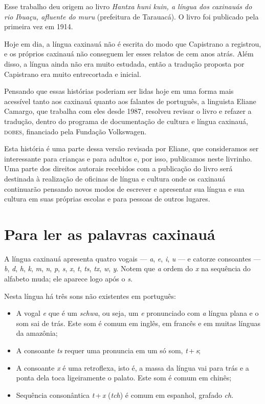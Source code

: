 Esse trabalho deu origem ao livro \textit{Hantxa huni kuin, a língua dos caxinauás do rio Ibuaçu, afluente do muru} (prefeitura de Tarauacá). O livro foi publicado pela primeira vez em 1914.

Hoje em dia, a língua caxinauá não é escrita do modo que Capistrano a
registrou, e os próprios caxinauá não conseguem ler esses relatos de
cem anos atrás. Além disso, a língua ainda não era muito estudada, então
a tradução proposta por Capistrano era muito entrecortada e inicial.


Pensando que essas histórias poderiam ser lidas hoje em uma forma mais acessível tanto aos caxinauá quanto aos falantes de português, a linguista Eliane Camargo, que
trabalha com eles desde 1987, resolveu revisar o livro e refazer a tradução, dentro do programa de documentação de cultura e língua caxinauá, \textsc{dobes}, financiado pela
Fundação Volkswagen.

Esta história é uma parte dessa versão revisada por Eliane, que consideramos ser interessante para crianças e para adultos e, por isso, publicamos neste livrinho. Uma parte
dos direitos autorais recebidos com a publicação do livro será destinada à realização de oficinas de língua e cultura onde os caxinauá continuarão pensando novos modos de
escrever e apresentar sua língua e sua cultura em suas próprias escolas e para pessoas de outros lugares.


\chapter{Para ler as palavras caxinauá}

A língua caxinauá apresenta quatro vogais --- \textit{a}, \textit{e}, \textit{i}, \textit{u} --- e catorze consoantes --- \textit{b}, \textit{d}, \textit{h}, \textit{k}, \textit{m}, \textit{n}, \textit{p}, \textit{s}, \textit{x}, \textit{t}, \textit{ts}, \textit{tx}, \textit{w}, \textit{y}. Notem que \textit{a} ordem do \textit{x} na sequência do alfabeto muda;
ele aparece logo após o \textit{s}.

Nesta língua há três sons não existentes em português:

\begin{itemize}
\item A vogal \textit{e} que é um \textit{schwa}, ou seja, um \textit{e} pronunciado com \textit{a} língua plana e o som sai de trás. Este som é comum em inglês, em francês e em muitas línguas da amazônia;

\item A consoante \textit{ts} requer uma pronuncia em um só som, \textit{t}\,+\,\textit{s};

\item A consoante \textit{x} é uma retroflexa, isto é, a massa da língua vai para trás e a ponta dela toca ligeiramente o palato. Este som é comum em chinês;

\item Sequência consonântica \textit{t}\,+\,\textit{x} (\textit{tch}) é comum em espanhol, grafado \textit{ch}.
\end{itemize}

